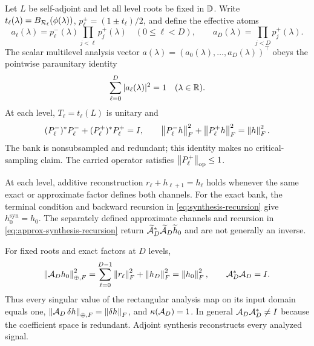 \begin{theorem}
\label{thm:pointwise-partition}
\label{thm:tight-split}
Let $L$ be self-adjoint and let all level roots be fixed in $\mathbb D$.  Write
$t_\ell(\lambda)=B_{\mathcal R_\ell}(\phi(\lambda))$,
$p_\ell^\pm=(1\pm t_\ell)/2$, and define the effective atoms
\begin{equation}
 a_\ell(\lambda)=p_\ell^-(\lambda)
                  \prod_{j<\ell}p_j^+(\lambda)\quad(0\leq\ell<D),
 \qquad
 a_D(\lambda)=\prod_{j<D}p_j^+(\lambda).
 \label{eq:effective-atoms}
\end{equation}
The scalar multilevel analysis vector
$a(\lambda)=(a_0(\lambda),\ldots,a_D(\lambda))^\top$ obeys the pointwise
paraunitary identity
\begin{equation}
 \sum_{\ell=0}^{D}|a_\ell(\lambda)|^2=1
 \quad(\lambda\in\mathbb R).
 \label{eq:pointwise-partition}
\end{equation}
At each level, $T_\ell=t_\ell(L)$ is unitary and
\begin{equation}
 (P_\ell^-)^*P_\ell^-+(P_\ell^+)^*P_\ell^+=I,
 \qquad
 \left\lVert P_\ell^-h\right\rVert_F^2+\left\lVert P_\ell^+h\right\rVert_F^2=\left\lVert h\right\rVert_F^2.
 \label{eq:parseval-operator}
\end{equation}
The bank is nonsubsampled and redundant; this identity makes no
critical-sampling claim.  The carried operator satisfies
$\left\lVert P_\ell^+\right\rVert_{\mathrm{op}}\leq1$.
\end{theorem}

\begin{proposition}
\label{prop:two-reconstructions}
At each level, additive reconstruction
$r_\ell+h_{\ell+1}=h_\ell$ holds whenever the same exact or approximate
factor defines both channels.  For the exact bank, the terminal condition and
backward recursion in \cref{eq:synthesis-recursion} give
$h_0^{\mathrm{syn}}=h_0$.  The separately defined approximate channels and
recursion in \cref{eq:approx-synthesis-recursion} return
$\widetilde{\mathcal A}_D^*\widetilde{\mathcal A}_D\widetilde h_0$ and are not generally an
inverse.
\end{proposition}

\begin{theorem}
\label{thm:multilevel-pr}
For fixed roots and exact factors at $D$ levels,
\begin{equation}
 \left\lVert \mathcal A_Dh_0\right\rVert_{\oplus,F}^2
 =\sum_{\ell=0}^{D-1}\left\lVert r_\ell\right\rVert_F^2+\left\lVert h_D\right\rVert_F^2
 =\left\lVert h_0\right\rVert_F^2,
 \qquad \mathcal A_D^*\mathcal A_D=I.
 \label{eq:multilevel-isometry}
\end{equation}
Thus every singular value of the rectangular analysis map on its input domain
equals one, $\left\lVert \mathcal A_D\,\delta h\right\rVert_{\oplus,F}=\left\lVert \delta h\right\rVert_F$, and
$\kappa(\mathcal A_D)=1$.  In general
$\mathcal A_D\mathcal A_D^*\neq I$ because the coefficient space is redundant.  Adjoint
synthesis reconstructs every analyzed signal.
\end{theorem}


